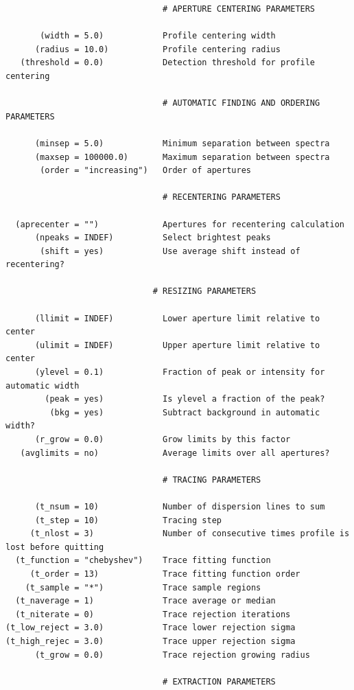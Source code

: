 \begin{verbatim}
                                # APERTURE CENTERING PARAMETERS

       (width = 5.0)            Profile centering width
      (radius = 10.0)           Profile centering radius
   (threshold = 0.0)            Detection threshold for profile centering

                                # AUTOMATIC FINDING AND ORDERING PARAMETERS

      (minsep = 5.0)            Minimum separation between spectra
      (maxsep = 100000.0)       Maximum separation between spectra
       (order = "increasing")   Order of apertures

                                # RECENTERING PARAMETERS

  (aprecenter = "")             Apertures for recentering calculation
      (npeaks = INDEF)          Select brightest peaks
       (shift = yes)            Use average shift instead of recentering?

                              # RESIZING PARAMETERS

      (llimit = INDEF)          Lower aperture limit relative to center
      (ulimit = INDEF)          Upper aperture limit relative to center
      (ylevel = 0.1)            Fraction of peak or intensity for automatic width
        (peak = yes)            Is ylevel a fraction of the peak?
         (bkg = yes)            Subtract background in automatic width?
      (r_grow = 0.0)            Grow limits by this factor
   (avglimits = no)             Average limits over all apertures?

                                # TRACING PARAMETERS

      (t_nsum = 10)             Number of dispersion lines to sum
      (t_step = 10)             Tracing step
     (t_nlost = 3)              Number of consecutive times profile is lost before quitting
  (t_function = "chebyshev")    Trace fitting function
     (t_order = 13)             Trace fitting function order
    (t_sample = "*")            Trace sample regions
  (t_naverage = 1)              Trace average or median
  (t_niterate = 0)              Trace rejection iterations
(t_low_reject = 3.0)            Trace lower rejection sigma
(t_high_rejec = 3.0)            Trace upper rejection sigma
      (t_grow = 0.0)            Trace rejection growing radius

                                # EXTRACTION PARAMETERS


\end{verbatim}
